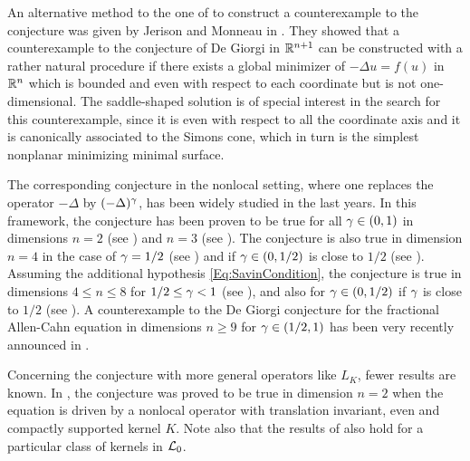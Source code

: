 An alternative method to the one of \cite{delPinoKowalczykWei} to construct a counterexample to the conjecture was given by Jerison and Monneau in \cite{JerisonMonneau}. They showed that a counterexample to the conjecture of De Giorgi in $\mathbb{R}^{n+1}$ can be constructed with a rather natural procedure if there exists a global minimizer of $-\Delta u = f(u)$ in $\mathbb{R}^n$ which is bounded and even with respect to each coordinate but is not one-dimensional. The saddle-shaped solution is of special interest in the search for this counterexample, since it is even with respect to all the coordinate axis and it is canonically associated to the Simons cone, which in turn is the simplest nonplanar minimizing minimal surface.




The corresponding conjecture in the nonlocal setting, where one replaces the operator $-\Delta$ by $(-\Delta)^\gamma$, has been widely studied in the last years. In this framework, the conjecture has been proven to be true for all $\gamma\in(0,1)$ in dimensions $n=2$ (see \cite{CabreSolaMorales, CabreSireI,SireValdinoci,BucurValdinoci-DeGiorgi}) and $n=3$ (see \cite{CabreCinti-EnergyHalfL, CabreCinti-SharpEnergy,DipierroFarinaValdinoci}). The conjecture is also true in dimension $n=4$ in the case of $\gamma = 1/2$ (see \cite{FigalliSerra}) and if $\gamma\in(0,1/2)$ is close to $1/2$ (see \cite{CabreCintiSerra-Stable}). Assuming the additional hypothesis \eqref{Eq:SavinCondition}, the conjecture is true in dimensions $4\leq n \leq 8$ for $1/2 \leq \gamma < 1$ (see \cite{Savin-Fractional,Savin-Fractional2}), and also for $\gamma\in(0,1/2)$ if $\gamma$ is close to $1/2$ (see \cite{DipierroSerraValdinoci}). A counterexample to the De Giorgi conjecture for the fractional Allen-Cahn equation in dimensions $n \geq 9$ for $\gamma \in (1/2,1)$ has been very recently announced in \cite{ChanLiuWei}.

Concerning the conjecture with more general operators like $L_K$, fewer results are known. In \cite{HamelRosOtonSireValdinoci}, the conjecture was proved to be true in dimension $n=2$ when the equation is driven by a nonlocal operator with translation invariant, even and compactly supported kernel $K$. Note also that the results of \cite{DipierroSerraValdinoci} also hold for a particular class of kernels in $\mathcal{L}_0$.





